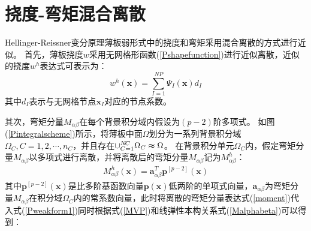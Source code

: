 \section{挠度-弯矩混合离散}
Hellinger-Reissner变分原理薄板弱形式中的挠度和弯矩采用混合离散的方式进行近似。
首先，薄板挠度$w$采用无网格形函数(\ref{Pshapefunction})进行近似离散，近似的挠度$w^h$表达式可表示为：
\begin{equation}\label{w}
    w^h(\pmb{x})=\sum_{I=1}^{N\!P}\Psi_I(\pmb{x})d_{I}
\end{equation}
其中$d_I$表示与无网格节点$\pmb{x}_I$对应的节点系数。\par
其次，弯矩分量$M_{\alpha\beta}$在每个背景积分域内假设为$(p-2)$阶多项式。
如图(\ref{Pintegralscheme})所示，将薄板中面$\Omega$划分为一系列背景积分域$\Omega_C,C=1,2,\dotsb,n_C$，并且存在$\cup_{C=1}^{N\!C}\Omega_C\thickapprox\Omega$。
在背景积分单元$\Omega_C$内，假定弯矩分量$M_{\alpha\beta}$以多项式进行离散，并将离散后的弯矩分量$M_{\alpha\beta}$记为$M_{\alpha\beta}^h$：
\begin{equation}\label{moment}
\begin{split}
    M^h_{\alpha\beta}(\pmb{x})=\pmb{a}_{\alpha\beta}^T\pmb{p}^{[p-2]}(\pmb{x})
\end{split}
\end{equation}
其中$\pmb{p}^{[p-2]}(\pmb x)$是比多阶基函数向量$\pmb{p}(\pmb{x})$低两阶的单项式向量，$\pmb{a}_{\alpha\beta}$为弯矩分量$M_{\alpha\beta}$在积分域$\Omega_C$内的常系数向量，此时将离散的弯矩分量表达式(\ref{moment})代入式(\ref{Pweakform1})同时根据式(\ref{MVP})和线弹性本构关系式(\ref{Malphabeta})可以得到：
